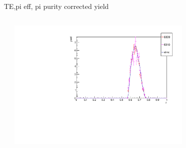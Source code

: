 \begin{frame}{TE,pi eff, pi purity corrected yield}
\begin{columns}
\begin{column}[T]{0.5\textwidth}
\end{column}
\begin{column}[T]{0.5\textwidth}
\includegraphics[width = 0.7\textwidth]{results/yield/check/yieldcheck_190_pos.pdf}
\end{column}
\end{columns}
\end{frame}
